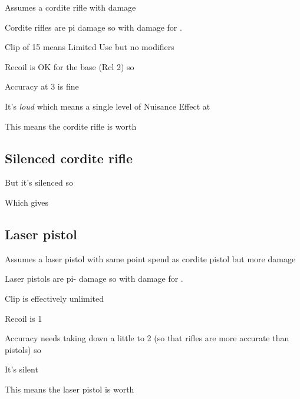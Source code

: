 Assumes a cordite rifle with  damage

\begin{innateattack}
  \item Cordite rifles are pi damage so  with
     damage for .
  \item Clip of 15 means Limited Use but no modifiers
  \item Recoil is OK for the base (Rcl 2) so 
  \item Accuracy at 3 is fine
  \item It's \emph{loud} which means a single level of Nuisance Effect at
  \item This means the cordite rifle is worth \InnateAttackTotalPoints{}
\end{innateattack}

\subsection{Silenced cordite rifle}
\label{sec:silenc-cord-rifle}

\begin{innateattack}
  \item {}
  \item But it's silenced so 
    
  \item Which gives \InnateAttackTotalPoints{}
\end{innateattack}
\begin{center}
  \InnateAttackBreakdown
\end{center}

\subsection{Laser pistol}
\label{sec:laser-pistol}

Assumes a laser pistol with same point spend as cordite pistol but more damage

\begin{innateattack}
  \item Laser pistols are pi- damage so  with
     damage for .
  \item Clip is effectively unlimited
  \item Recoil is 1
  \item Accuracy needs taking down a little to 2 (so that rifles are more
    accurate than pistols) so 
  \item It's silent
  \item This means the laser pistol is worth \InnateAttackTotalPoints{}
\end{innateattack}


